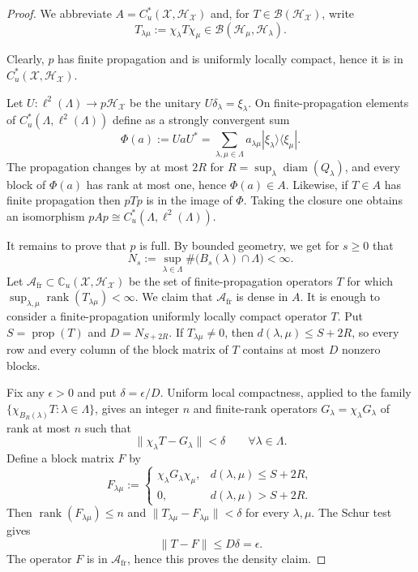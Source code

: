\documentclass[12pt]{amsart}
\newcommand{\CM}{{\mathbb C}}
\newcommand{\Bb}{{\mathcal B}}
\newcommand{\Hh}{{\mathcal H}}
\newcommand{\Xx}{{\mathcal X}}
\DeclareMathOperator{\diam}{diam}
\begin{document}
\begin{proof}
We abbreviate $A=C_u^*(\Xx,\Hh_\Xx)$ and, for $T\in\Bb(\Hh_\Xx)$, write
\[T_{\lambda\mu}:=\chi_\lambda T\chi_\mu
 \in\Bb(\Hh_\mu,\Hh_\lambda).\]

Clearly, $p$ has finite propagation and is uniformly locally compact, hence it is in $C^*_u(\Xx,\Hh_\Xx)$.

Let $U:\ell^2(\Lambda)\to p\Hh_\Xx$ be the unitary
$U\delta_\lambda=\xi_\lambda$.  On finite-propagation elements of $C^*_u(\Lambda,\ell^2(\Lambda))$ define as a strongly convergent sum
\[\Phi(a):=UaU^* =\sum_{\lambda,\mu\in\Lambda} a_{\lambda\mu}|\xi_\lambda\rangle\langle\xi_\mu|.\]
The propagation changes by at most $2R$ for $R=\sup_{\lambda}\diam(Q_\lambda)$, and every block of $\Phi(a)$ has rank
at most one, hence $\Phi(a)\in A$. Likewise, if $T\in A$ has finite propagation then $pTp$ is in the image of $\Phi$. Taking the closure one obtains an isomorphism $pAp\cong C_u^*(\Lambda,\ell^2(\Lambda)).$

It remains to prove that $p$ is full. 
By bounded geometry, we get for $s\geq0$ that
\[N_s:=\sup_{\lambda\in\Lambda} \#\bigl(B_s(\lambda)\cap\Lambda\bigr)<\infty.\]
 Let $\mathcal A_{\mathrm{fr}}\subset \CM_u(\Xx, \Hh_\Xx)$ be the set of finite-propagation operators $T$ for which $\sup_{\lambda,\mu}\operatorname{rank}(T_{\lambda\mu})<\infty$. 
We claim that $\mathcal A_{\mathrm{fr}}$ is dense in $A$.  It is enough to
consider a finite-propagation uniformly locally compact operator $T$.  Put
$S=\operatorname{prop}(T)$ and $D=N_{S+2R}$.  If $T_{\lambda\mu}\neq0$, then
$d(\lambda,\mu)\leq S+2R$, so every row and every column of the block matrix of
$T$ contains at most $D$ nonzero blocks.

Fix any $\epsilon>0$ and put $\delta=\epsilon/D$. Uniform local compactness, applied to the family
$\{\chi_{B_R(\lambda)}T:\lambda\in\Lambda\}$, gives an integer $n$ and
finite-rank operators $G_\lambda=\chi_\lambda G_\lambda$ of rank at most $n$ such that
\[\|\chi_{\lambda}T-G_\lambda\|<\delta
 \qquad \forall\lambda\in\Lambda.\]
Define a block matrix $F$ by
\[F_{\lambda\mu}:=
 \begin{cases}
  \chi_\lambda G_\lambda\chi_\mu,
     &d(\lambda,\mu)\leq S+2R,\\
  0,&d(\lambda,\mu)>S+2R.
 \end{cases}\]
Then $\operatorname{rank}(F_{\lambda\mu})\leq n$ and
$\|T_{\lambda\mu}-F_{\lambda\mu}\|<\delta$ for every $\lambda,\mu$.
The Schur test gives
\[\|T-F\|\leq D\delta=\epsilon.\]
The operator $F$ is in $\mathcal A_{\mathrm{fr}}$, hence this proves the density claim.


\end{proof}
\end{document}
